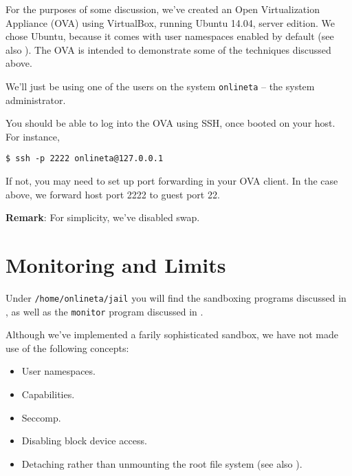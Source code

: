 For the purposes of some discussion, we've created an Open Virtualization
Appliance (OVA) using VirtualBox, running Ubuntu 14.04, server edition. We
chose Ubuntu, because it comes with user namespaces enabled by default (see
also ). The OVA is intended to
demonstrate some of the techniques discussed above.






We'll just be using one of the users on the system \texttt{onlineta} -- the
system administrator.

You should be able to log into the OVA using SSH, once booted on your host.
For instance,

\begin{lstlisting}
$ ssh -p 2222 onlineta@127.0.0.1
\end{lstlisting}

If not, you may need to set up port forwarding in your OVA client. In the case
above, we forward host port 2222 to guest port 22.

\textbf{Remark}: For simplicity, we've disabled swap.

\section{Monitoring and Limits}

Under \texttt{/home/onlineta/jail} you will find the sandboxing programs
discussed in , as well
as the \texttt{monitor} program discussed in
.

Although we've implemented a farily sophisticated sandbox, we have not made use
of the following concepts:

\begin{itemize}

\item User namespaces.

\item Capabilities.

\item Seccomp.

\item Disabling block device access.

\item Detaching rather than unmounting the root file system (see also
).

\end{itemize}

